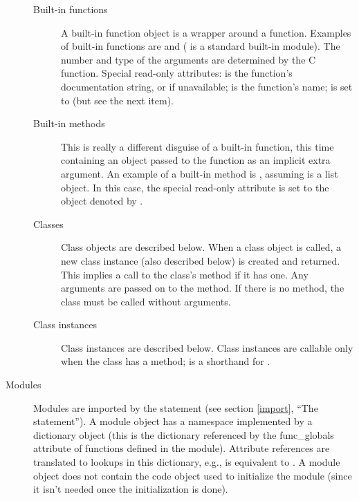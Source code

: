 \begin{description}
\begin{description}

\item[Built-in functions]
A built-in function object is a wrapper around a \C{} function.  Examples
of built-in functions are  and 
( is a standard built-in module).
The number and type of the arguments are
determined by the C function.
Special read-only attributes:  is the function's
documentation string, or  if unavailable; 
is the function's name;  is set to  (but see
the next item).

\item[Built-in methods]
This is really a different disguise of a built-in function, this time
containing an object passed to the \C{} function as an implicit extra
argument.  An example of a built-in method is
, assuming
 is a list object.
In this case, the special read-only attribute  is set
to the object denoted by .

\item[Classes]
Class objects are described below.  When a class object is called,
a new class instance (also described below) is created and
returned.  This implies a call to the class's  method
if it has one.  Any arguments are passed on to the 
method.  If there is no  method, the class must be called
without arguments.

\item[Class instances]
Class instances are described below.  Class instances are callable
only when the class has a  method; 
is a shorthand for .

\end{description}

\item[Modules]
Modules are imported by the  statement (see section
\ref{import}, ``The  statement'').
A module object has a namespace implemented by a dictionary object
(this is the dictionary referenced by the func_globals attribute of
functions defined in the module).  Attribute references are translated
to lookups in this dictionary, e.g.,  is equivalent to
.
A module object does not contain the code object used to
initialize the module (since it isn't needed once the initialization
is done).


\end{description}
